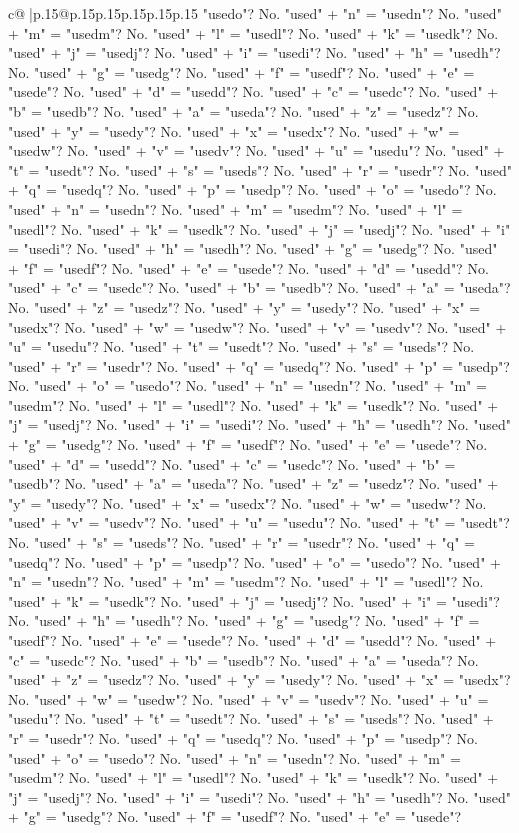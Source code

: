 \documentclass{article}
\begin{document}
{\begin{supertabular}{c@{$\;$}|p{.15\linewidth}@{}p{.15\linewidth}p{.15\linewidth}p{.15\linewidth}p{.15\linewidth}p{.15\linewidth}}
{{{"usedo"? No. "used" + "n" = "usedn"? No. "used" + "m" = "usedm"? No. "used" + "l" = "usedl"? No. "used" + "k" = "usedk"? No. "used" + "j" = "usedj"? No. "used" + "i" = "usedi"? No. "used" + "h" = "usedh"? No. "used" + "g" = "usedg"? No. "used" + "f" = "usedf"? No. "used" + "e" = "usede"? No. "used" + "d" = "usedd"? No. "used" + "c" = "usedc"? No. "used" + "b" = "usedb"? No. "used" + "a" = "useda"? No. "used" + "z" = "usedz"? No. "used" + "y" = "usedy"? No. "used" + "x" = "usedx"? No. "used" + "w" = "usedw"? No. "used" + "v" = "usedv"? No. "used" + "u" = "usedu"? No. "used" + "t" = "usedt"? No. "used" + "s" = "useds"? No. "used" + "r" = "usedr"? No. "used" + "q" = "usedq"? No. "used" + "p" = "usedp"? No. "used" + "o" = "usedo"? No. "used" + "n" = "usedn"? No. "used" + "m" = "usedm"? No. "used" + "l" = "usedl"? No. "used" + "k" = "usedk"? No. "used" + "j" = "usedj"? No. "used" + "i" = "usedi"? No. "used" + "h" = "usedh"? No. "used" + "g" = "usedg"? No. "used" + "f" = "usedf"? No. "used" + "e" = "usede"? No. "used" + "d" = "usedd"? No. "used" + "c" = "usedc"? No. "used" + "b" = "usedb"? No. "used" + "a" = "useda"? No. "used" + "z" = "usedz"? No. "used" + "y" = "usedy"? No. "used" + "x" = "usedx"? No. "used" + "w" = "usedw"? No. "used" + "v" = "usedv"? No. "used" + "u" = "usedu"? No. "used" + "t" = "usedt"? No. "used" + "s" = "useds"? No. "used" + "r" = "usedr"? No. "used" + "q" = "usedq"? No. "used" + "p" = "usedp"? No. "used" + "o" = "usedo"? No. "used" + "n" = "usedn"? No. "used" + "m" = "usedm"? No. "used" + "l" = "usedl"? No. "used" + "k" = "usedk"? No. "used" + "j" = "usedj"? No. "used" + "i" = "usedi"? No. "used" + "h" = "usedh"? No. "used" + "g" = "usedg"? No. "used" + "f" = "usedf"? No. "used" + "e" = "usede"? No. "used" + "d" = "usedd"? No. "used" + "c" = "usedc"? No. "used" + "b" = "usedb"? No. "used" + "a" = "useda"? No. "used" + "z" = "usedz"? No. "used" + "y" = "usedy"? No. "used" + "x" = "usedx"? No. "used" + "w" = "usedw"? No. "used" + "v" = "usedv"? No. "used" + "u" = "usedu"? No. "used" + "t" = "usedt"? No. "used" + "s" = "useds"? No. "used" + "r" = "usedr"? No. "used" + "q" = "usedq"? No. "used" + "p" = "usedp"? No. "used" + "o" = "usedo"? No. "used" + "n" = "usedn"? No. "used" + "m" = "usedm"? No. "used" + "l" = "usedl"? No. "used" + "k" = "usedk"? No. "used" + "j" = "usedj"? No. "used" + "i" = "usedi"? No. "used" + "h" = "usedh"? No. "used" + "g" = "usedg"? No. "used" + "f" = "usedf"? No. "used" + "e" = "usede"? No. "used" + "d" = "usedd"? No. "used" + "c" = "usedc"? No. "used" + "b" = "usedb"? No. "used" + "a" = "useda"? No. "used" + "z" = "usedz"? No. "used" + "y" = "usedy"? No. "used" + "x" = "usedx"? No. "used" + "w" = "usedw"? No. "used" + "v" = "usedv"? No. "used" + "u" = "usedu"? No. "used" + "t" = "usedt"? No. "used" + "s" = "useds"? No. "used" + "r" = "usedr"? No. "used" + "q" = "usedq"? No. "used" + "p" = "usedp"? No. "used" + "o" = "usedo"? No. "used" + "n" = "usedn"? No. "used" + "m" = "usedm"? No. "used" + "l" = "usedl"? No. "used" + "k" = "usedk"? No. "used" + "j" = "usedj"? No. "used" + "i" = "usedi"? No. "used" + "h" = "usedh"? No. "used" + "g" = "usedg"? No. "used" + "f" = "usedf"? No. "used" + "e" = "usede"? }}}
\end{supertabular}}
\end{document}
